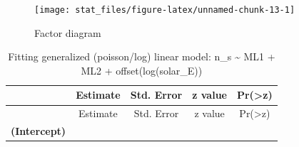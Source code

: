 \documentclass[11pt,]{article}
\begin{document}
\begin{figure}

{\centering \texttt{[image: stat\_files/figure-latex/unnamed-chunk-13-1]} 

}

\caption{Factor diagram}\label{fig:unnamed-chunk-13}
\end{figure}

\begin{longtable}[]{@{}ccccc@{}}
\caption{Fitting generalized (poisson/log) linear model: n\_s
\textasciitilde{} ML1 + ML2 + offset(log(solar\_E))}\tabularnewline
\toprule
\begin{minipage}[b]{0.21\columnwidth}\centering
~\strut
\end{minipage} & \begin{minipage}[b]{0.13\columnwidth}\centering
Estimate\strut
\end{minipage} & \begin{minipage}[b]{0.16\columnwidth}\centering
Std. Error\strut
\end{minipage} & \begin{minipage}[b]{0.12\columnwidth}\centering
z value\strut
\end{minipage} & \begin{minipage}[b]{0.16\columnwidth}\centering
Pr(\textgreater{}\textbar{}z\textbar{})\strut
\end{minipage}\tabularnewline
\midrule
\endfirsthead
\toprule
\begin{minipage}[b]{0.21\columnwidth}\centering
~\strut
\end{minipage} & \begin{minipage}[b]{0.13\columnwidth}\centering
Estimate\strut
\end{minipage} & \begin{minipage}[b]{0.16\columnwidth}\centering
Std. Error\strut
\end{minipage} & \begin{minipage}[b]{0.12\columnwidth}\centering
z value\strut
\end{minipage} & \begin{minipage}[b]{0.16\columnwidth}\centering
Pr(\textgreater{}\textbar{}z\textbar{})\strut
\end{minipage}\tabularnewline
\midrule
\endhead
\begin{minipage}[t]{0.21\columnwidth}\centering
\textbf{(Intercept)}\strut
\end{minipage} & \begin{minipage}[t]{0.13\columnwidth}\centering

\end{minipage}
\end{longtable}
\end{document}

